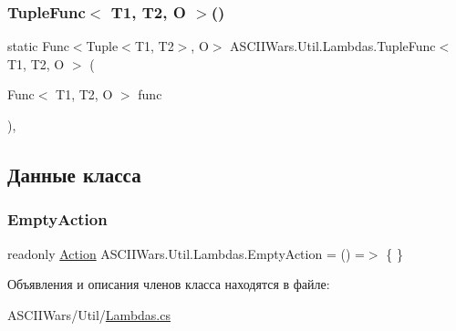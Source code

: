 \hypertarget{class_a_s_c_i_i_wars_1_1_util_1_1_lambdas_a99f022c2c1ad621c89644afac676c722}{}\label{class_a_s_c_i_i_wars_1_1_util_1_1_lambdas_a99f022c2c1ad621c89644afac676c722} 
\subsubsection{\texorpdfstring{Tuple\+Func$<$ T1, T2, O $>$()}{TupleFunc< T1, T2, O >()}}
{\footnotesize\ttfamily static Func$<$Tuple$<$T1, T2$>$, O$>$ A\+S\+C\+I\+I\+Wars.\+Util.\+Lambdas.\+Tuple\+Func$<$ T1, T2, O $>$ (\begin{DoxyParamCaption}\item[{Func$<$ T1, T2, O $>$}]{func }\end{DoxyParamCaption})\hspace{0.3cm}{\ttfamily [inline]}, {\ttfamily [static]}}



\subsection{Данные класса}
\hypertarget{class_a_s_c_i_i_wars_1_1_util_1_1_lambdas_aab7ecf777227e68d10c96568758f6782}{}\label{class_a_s_c_i_i_wars_1_1_util_1_1_lambdas_aab7ecf777227e68d10c96568758f6782} 
\subsubsection{\texorpdfstring{Empty\+Action}{EmptyAction}}
{\footnotesize\ttfamily readonly \hyperlink{class_a_s_c_i_i_wars_1_1_util_1_1_lambdas_a4bc80215a9cdc6519f88d7d73ef0a2d9}{Action} A\+S\+C\+I\+I\+Wars.\+Util.\+Lambdas.\+Empty\+Action = () =$>$ \{ \}\hspace{0.3cm}{\ttfamily [static]}}



Объявления и описания членов класса находятся в файле\+:\begin{DoxyCompactItemize}
\item 
A\+S\+C\+I\+I\+Wars/\+Util/\hyperlink{_lambdas_8cs}{Lambdas.\+cs}\end{DoxyCompactItemize}

